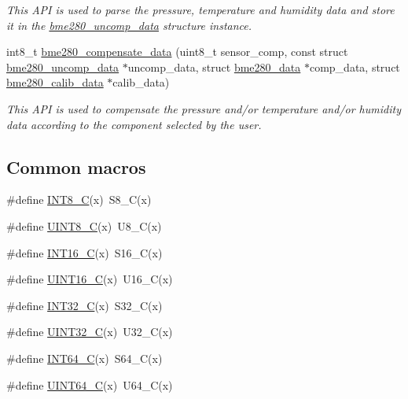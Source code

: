 \begin{DoxyCompactItemize}
\begin{DoxyCompactList}\small\item\em This A\+PI is used to parse the pressure, temperature and humidity data and store it in the \hyperlink{structbme280__uncomp__data}{bme280\+\_\+uncomp\+\_\+data} structure instance. \end{DoxyCompactList}\item 
int8\+\_\+t \hyperlink{group___b_m_e280_ga9f2c3c8c683b434ca10447515f85c0de}{bme280\+\_\+compensate\+\_\+data} (uint8\+\_\+t sensor\+\_\+comp, const struct \hyperlink{structbme280__uncomp__data}{bme280\+\_\+uncomp\+\_\+data} $\ast$uncomp\+\_\+data, struct \hyperlink{structbme280__data}{bme280\+\_\+data} $\ast$comp\+\_\+data, struct \hyperlink{structbme280__calib__data}{bme280\+\_\+calib\+\_\+data} $\ast$calib\+\_\+data)
\begin{DoxyCompactList}\small\item\em This A\+PI is used to compensate the pressure and/or temperature and/or humidity data according to the component selected by the user. \end{DoxyCompactList}\end{DoxyCompactItemize}
\subsection*{Common macros}
\begin{DoxyCompactItemize}
\item 
\#define \hyperlink{group___b_m_e280_ga1eaa7db37089dcdfb60227725c9c1585}{I\+N\+T8\+\_\+C}(x)~S8\+\_\+C(x)
\item 
\#define \hyperlink{group___b_m_e280_gacd2aa09844a8a245cf7fdbb808e215e5}{U\+I\+N\+T8\+\_\+C}(x)~U8\+\_\+C(x)
\item 
\#define \hyperlink{group___b_m_e280_ga838b261fec725cb0f5d5b6769d3521e7}{I\+N\+T16\+\_\+C}(x)~S16\+\_\+C(x)
\item 
\#define \hyperlink{group___b_m_e280_ga1cb39a2cfaf899fd38730c7637807708}{U\+I\+N\+T16\+\_\+C}(x)~U16\+\_\+C(x)
\item 
\#define \hyperlink{group___b_m_e280_gad78650fb7726f4e99205406569ef403d}{I\+N\+T32\+\_\+C}(x)~S32\+\_\+C(x)
\item 
\#define \hyperlink{group___b_m_e280_ga2451a7ede7ebd810357f1503e9898ea6}{U\+I\+N\+T32\+\_\+C}(x)~U32\+\_\+C(x)
\item 
\#define \hyperlink{group___b_m_e280_ga93d102802b35d3b8abae9bbe7f0fed75}{I\+N\+T64\+\_\+C}(x)~S64\+\_\+C(x)
\item 
\#define \hyperlink{group___b_m_e280_ga134ae84400d184ed2570e3270d5472c2}{U\+I\+N\+T64\+\_\+C}(x)~U64\+\_\+C(x)
\end{DoxyCompactItemize}
